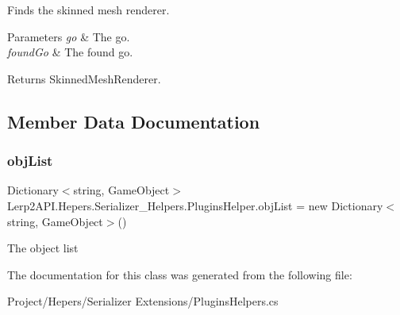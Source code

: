 Finds the skinned mesh renderer. 


\begin{DoxyParams}{Parameters}
{\em go} & The go.\\
\hline
{\em found\+Go} & The found go.\\
\hline
\end{DoxyParams}
\begin{DoxyReturn}{Returns}
Skinned\+Mesh\+Renderer.
\end{DoxyReturn}


\subsection{Member Data Documentation}
\mbox{\label{class_lerp2_a_p_i_1_1_hepers_1_1_serializer___helpers_1_1_plugins_helper_aff941d6198344773b2d462247521c1d3}} 
\subsubsection{\texorpdfstring{obj\+List}{objList}}
{\footnotesize\ttfamily Dictionary$<$string, Game\+Object$>$ Lerp2\+A\+P\+I.\+Hepers.\+Serializer\+\_\+\+Helpers.\+Plugins\+Helper.\+obj\+List = new Dictionary$<$string, Game\+Object$>$()\hspace{0.3cm}{\ttfamily [static]}}



The object list 



The documentation for this class was generated from the following file\+:\begin{DoxyCompactItemize}
\item 
Project/\+Hepers/\+Serializer Extensions/Plugins\+Helpers.\+cs\end{DoxyCompactItemize}
